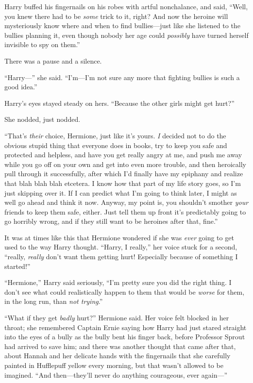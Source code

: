 Harry buffed his fingernails on his robes with artful nonchalance, and said, “Well, you knew there had to be \emph{some} trick to it, right? And now the heroine will mysteriously know where and when to find bullies—just like she listened to the bullies planning it, even though nobody her age could \emph{possibly} have turned herself invisible to spy on them.”

There was a pause and a silence.

“Harry—” she said. “I’m—I’m not sure any more that fighting bullies is such a good idea.”

Harry’s eyes stayed steady on hers. “Because the other girls might get hurt?”

She nodded, just nodded.

“That’s \emph{their} choice, Hermione, just like it’s yours. \emph{I} decided not to do the obvious stupid thing that everyone does in books, try to keep you safe and protected and helpless, and have you get really angry at me, and push me away while you go off on your own and get into even more trouble, and then heroically pull through it successfully, after which I’d finally have my epiphany and realize that blah blah blah etcetera. I know how that part of my life story goes, so I’m just skipping over it. If I can predict what I’m going to think later, I might as well go ahead and think it now. Anyway, my point is, you shouldn’t smother \emph{your} friends to keep them safe, either. Just tell them up front it’s predictably going to go horribly wrong, and if they still want to be heroines after that, fine.”

It was at times like this that Hermione wondered if she was \emph{ever} going to get used to the way Harry thought. “Harry, I really,” her voice stuck for a second, “really, \emph{really} don’t want them getting hurt! Especially because of something I started!”

“Hermione,” Harry said seriously, “I’m pretty sure you did the right thing. I don’t see what could realistically happen to them that would be \emph{worse} for them, in the long run, than \emph{not trying}.”

“What if they get \emph{badly} hurt?” Hermione said. Her voice felt blocked in her throat; she remembered Captain Ernie saying how Harry had just stared straight into the eyes of a bully as the bully bent his finger back, before Professor Sprout had arrived to save him; and there was another thought that came after that, about Hannah and her delicate hands with the fingernails that she carefully painted in Hufflepuff yellow every morning, but that wasn’t allowed to be imagined. “And then—they’ll never do anything courageous, ever again—”

